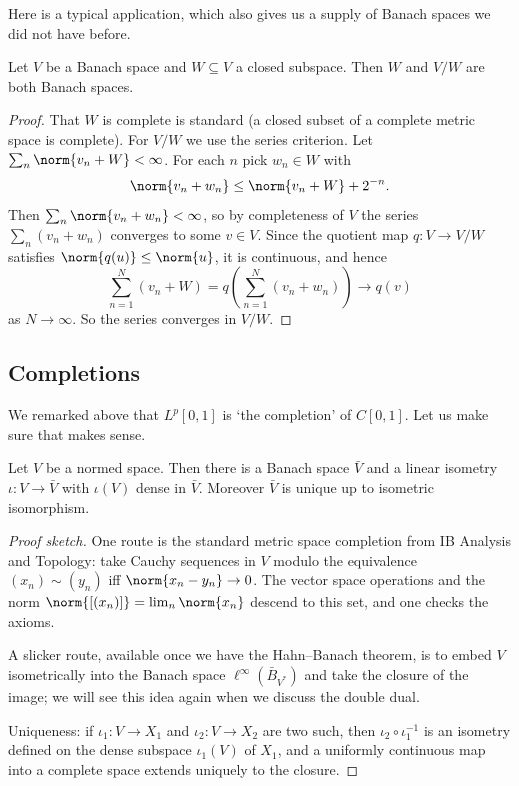 Here is a typical application, which also gives us a supply of Banach spaces we did not have before.

\begin{proposition}
	Let $V$ be a Banach space and $W \subseteq V$ a closed subspace. Then $W$ and $V/W$ are both Banach spaces.
\end{proposition}

\begin{proof}
	That $W$ is complete is standard (a closed subset of a complete metric space is complete). For $V/W$ we use the series criterion. Let $\sum_n \norm{v_n + W} < \infty$. For each $n$ pick $w_n \in W$ with
	$$\norm{v_n + w_n} \leq \norm{v_n + W} + 2^{-n}.$$
	Then $\sum_n \norm{v_n + w_n} < \infty$, so by completeness of $V$ the series $\sum_n (v_n + w_n)$ converges to some $v \in V$. Since the quotient map $q : V \to V/W$ satisfies $\norm{q(u)} \leq \norm{u}$, it is continuous, and hence
	$$\sum_{n=1}^N (v_n + W) = q\left( \sum_{n=1}^N (v_n + w_n) \right) \longrightarrow q(v)$$
	as $N \to \infty$. So the series converges in $V/W$.
\end{proof}

\subsection{Completions}

We remarked above that $L^p[0,1]$ is `the completion' of $C[0,1]$. Let us make sure that makes sense.

\begin{theorem}[Completion]
	Let $V$ be a normed space. Then there is a Banach space $\bar{V}$ and a linear isometry $\iota : V \to \bar{V}$ with $\iota(V)$ dense in $\bar{V}$. Moreover $\bar{V}$ is unique up to isometric isomorphism.
\end{theorem}

\begin{proof}[Proof sketch]
	One route is the standard metric space completion from IB Analysis and Topology: take Cauchy sequences in $V$ modulo the equivalence $(x_n) \sim (y_n)$ iff $\norm{x_n - y_n} \to 0$. The vector space operations and the norm $\norm{[(x_n)]} = \lim_n \norm{x_n}$ descend to this set, and one checks the axioms.

	A slicker route, available once we have the Hahn--Banach theorem, is to embed $V$ isometrically into the Banach space $\ell^\infty(\bar{B}_{V^*})$ and take the closure of the image; we will see this idea again when we discuss the double dual.

	Uniqueness: if $\iota_1 : V \to X_1$ and $\iota_2 : V \to X_2$ are two such, then $\iota_2 \circ \iota_1^{-1}$ is an isometry defined on the dense subspace $\iota_1(V)$ of $X_1$, and a uniformly continuous map into a complete space extends uniquely to the closure.
\end{proof}

